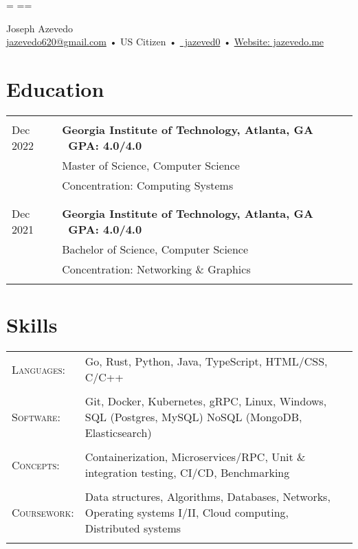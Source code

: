 \documentclass[a4paper,11pt]{article}
\newenvironment{rsection}[1]
  {
    \section{#1}
    \begin{tabular}{>{\raggedleft\arraybackslash}p{\lcolwidth}|p{\rcolwidth}}
   } {
    \\\multicolumn{2}{c}{} \\[-10pt]
    \end{tabular}
  }
\newcommand{\rheader}[2]{
    \multirow[t]{2}{*}{
        \begin{minipage}[t]{\dimexpr \lcolwidth - 0.1cm}
            \begin{flushright}
                \textsc{#1}
            \end{flushright}
        \end{minipage}
    } & \textbf{#2}
}
\newcommand{\rline}[1]{\\& #1}
\newcommand{\ritem}[2][ •\hspace{3pt}]{\\[-2pt]& \footnotesize{#1#2}}
\newenvironment{rskills}[1][Skills]
  {
    \section{#1}
    \begin{tabular}{>{\raggedleft\arraybackslash}p{\lcolwidth}p{\rcolwidth}}
    } {
    \end{tabular}
  }
\newcommand{\rskill}[2]{\textsc{#1}:& \small #2 \\ & \\[-14pt]}
\newcommand{\rskip}{\\\multicolumn{2}{c}{} \\[\subsectionvspace]}
\newcommand{\rdot}{\xspace\hspace{0pt}•\hspace{3pt}\xspace}
\begin{document}
\hsize=\hlinewidth \vsize=11in
\hoffset=\pagehoffset \voffset=\pagevoffset
\pdfpagewidth=8.5in
\pdfpageheight=11in
\pagestyle{empty}

\newcommand{\at}{@}
\newcommand{\gmaildotcom}{gmail.com}

\newcommand{\phoneandrdot}{\xspace}

\begin{center}
     \Huge       Joseph Azevedo
  \\[2pt] \normalsize \href{mailto:jazevedo620\at\gmaildotcom}{jazevedo620\at\gmaildotcom}
    \rdot US Citizen \rdot \phoneandrdot
\href{https://github.com/jazeved0}{\faGithub\ jazeved0} \rdot
    \href{https://jazevedo.me}{Website: jazevedo.me} \\[6pt]
\end{center}
\vspace{\dimexpr \sectionvspace + 15pt}


\begin{rsection}{Education}
  \rheader{Jan 2022 -\\[-1pt] Dec 2022}{Georgia Institute of Technology,
    {\normalfont Atlanta, GA \hfill\  GPA: 4.0/4.0\ }}
  \rline{Master of Science, Computer Science}
  \vspace{2pt}
  \ritem[]{Concentration: Computing Systems}
  \rskip
  \rheader{Jun 2018 -\\[-1pt] Dec 2021}{Georgia Institute of Technology,
    {\normalfont Atlanta, GA \hfill\  GPA: 4.0/4.0\ }}
  \rline{Bachelor of Science, Computer Science}
  \vspace{2pt}
  \ritem[]{Concentration: Networking \& Graphics}
\end{rsection}
\vspace{\sectionvspace}


\begin{rskills}
  \rskill{Languages}  {Go, Rust, Python, Java, TypeScript, HTML/CSS, C/C++}
  \rskill{Software}   {Git, Docker, Kubernetes, gRPC, Linux, Windows, SQL (Postgres, MySQL)
                      NoSQL (MongoDB, Elasticsearch)}
  \rskill{Concepts}   {Containerization, Microservices/RPC,
                      Unit \& integration testing, CI/CD, Benchmarking}
  \rskill{Coursework} {Data structures, Algorithms, Databases, Networks,
                      Operating systems I/II, Cloud computing, Distributed systems}
\end{rskills}
\vspace{\dimexpr \sectionvspace + 11pt}
\end{document}
